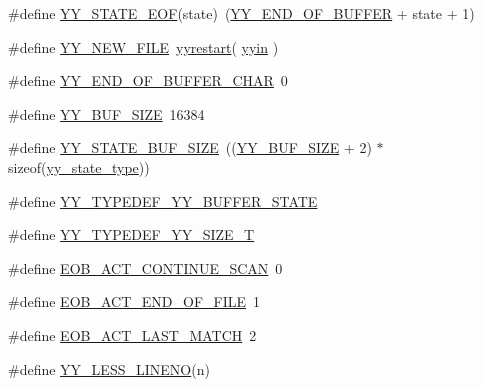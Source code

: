 \begin{DoxyCompactItemize}
\item 
\#define \hyperlink{_genesys_09_09-scanner_8cpp_ab3077e60914fc54dcc55ecae1ce9700b}{Y\-Y\-\_\-\-S\-T\-A\-T\-E\-\_\-\-E\-O\-F}(state)~(\hyperlink{_genesys_09_09-scanner_8cpp_ab2708fd42cff29ce6a0a52b91bea40d1}{Y\-Y\-\_\-\-E\-N\-D\-\_\-\-O\-F\-\_\-\-B\-U\-F\-F\-E\-R} + state + 1)
\item 
\#define \hyperlink{_genesys_09_09-scanner_8cpp_a0406739e64fb5750cf995d2ae68ce69d}{Y\-Y\-\_\-\-N\-E\-W\-\_\-\-F\-I\-L\-E}~\hyperlink{_genesys_09_09-scanner_8cpp_ab657ddef65d43cc3ab8dfc2cad0ac5b8}{yyrestart}( \hyperlink{_genesys_09_09-scanner_8cpp_a87a127afa8f6c307fbfba10390675406}{yyin}  )
\item 
\#define \hyperlink{_genesys_09_09-scanner_8cpp_ab866a64da164ed2d4d444df1ef1fc9b3}{Y\-Y\-\_\-\-E\-N\-D\-\_\-\-O\-F\-\_\-\-B\-U\-F\-F\-E\-R\-\_\-\-C\-H\-A\-R}~0
\item 
\#define \hyperlink{_genesys_09_09-scanner_8cpp_ae7e51116e747d3390e7a6cfc6532834c}{Y\-Y\-\_\-\-B\-U\-F\-\_\-\-S\-I\-Z\-E}~16384
\item 
\#define \hyperlink{_genesys_09_09-scanner_8cpp_ac2f8b6fccdc516d96b02ac09a4dc01bd}{Y\-Y\-\_\-\-S\-T\-A\-T\-E\-\_\-\-B\-U\-F\-\_\-\-S\-I\-Z\-E}~((\hyperlink{_genesys_09_09-scanner_8cpp_ae7e51116e747d3390e7a6cfc6532834c}{Y\-Y\-\_\-\-B\-U\-F\-\_\-\-S\-I\-Z\-E} + 2) $\ast$ sizeof(\hyperlink{_genesys_09_09-scanner_8cpp_a9ba7c416f135b0f0c1f4addded4616b5}{yy\-\_\-state\-\_\-type}))
\item 
\#define \hyperlink{_genesys_09_09-scanner_8cpp_aa79d63ed3ff8d2249baf1732a73089f5}{Y\-Y\-\_\-\-T\-Y\-P\-E\-D\-E\-F\-\_\-\-Y\-Y\-\_\-\-B\-U\-F\-F\-E\-R\-\_\-\-S\-T\-A\-T\-E}
\item 
\#define \hyperlink{_genesys_09_09-scanner_8cpp_ae0f2b0b5f04b2338367826b5670774f9}{Y\-Y\-\_\-\-T\-Y\-P\-E\-D\-E\-F\-\_\-\-Y\-Y\-\_\-\-S\-I\-Z\-E\-\_\-\-T}
\item 
\#define \hyperlink{_genesys_09_09-scanner_8cpp_adf4b0db227e07782e28ade353a7ba7a1}{E\-O\-B\-\_\-\-A\-C\-T\-\_\-\-C\-O\-N\-T\-I\-N\-U\-E\-\_\-\-S\-C\-A\-N}~0
\item 
\#define \hyperlink{_genesys_09_09-scanner_8cpp_a7f71d7fa2c403eb4b2f38cb9536f3c63}{E\-O\-B\-\_\-\-A\-C\-T\-\_\-\-E\-N\-D\-\_\-\-O\-F\-\_\-\-F\-I\-L\-E}~1
\item 
\#define \hyperlink{_genesys_09_09-scanner_8cpp_ad1a0b5ebcabffe388e9e9ebb2619c1fb}{E\-O\-B\-\_\-\-A\-C\-T\-\_\-\-L\-A\-S\-T\-\_\-\-M\-A\-T\-C\-H}~2
\item 
\#define \hyperlink{_genesys_09_09-scanner_8cpp_a12e5f3a76911433480bca7f4edba6119}{Y\-Y\-\_\-\-L\-E\-S\-S\-\_\-\-L\-I\-N\-E\-N\-O}(n)

\end{DoxyCompactItemize}
